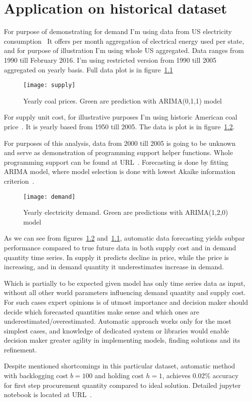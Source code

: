 
\chapter{Application on historical dataset}
\label{chap:Application on historical dataset}

For purpose of demonstrating for demand I'm using data from US electricity consumption~\autocite{us-elec} It offers per month aggregation of electrical energy used per state, and for purpose of illustration I'm using whole US aggregated. Data ranges from 1990 till February 2016. I'm using restricted version from 1990 till 2005 aggregated on yearly basis. Full data plot is in figure~\ref{fig:supply}

\begin{figure}[]
  \centering
  \texttt{[image: supply]}
  \caption{Yearly coal prices. Green are prediction with ARIMA(0,1,1) model}
  \label{fig:supply}
\end{figure}

For supply unit cost, for illustrative purposes I'm using historic American coal price~\autocite{us-coal}. It is yearly based from 1950 till 2005. The data is plot is in figure~\ref{fig:demand}.

For purposes of this analysis, data from 2000 till 2005 is going to be unknown and serve as demonstration of programming support helper functions. Whole programming support can be found at URL~\autocite{code}. Forecasting is done by fitting ARIMA model, where model selection is done with lowest Akaike information criterion~\autocite{Akaike1974}.

\begin{figure}[]
  \centering
  \texttt{[image: demand]}
  \caption{Yearly electricity demand. Green are predictions with ARIMA(1,2,0) model}
  \label{fig:demand}
\end{figure}

As we can see from figures~\ref{fig:demand} and~\ref{fig:supply}, automatic data forecasting yields subpar performance compared to true future data in both supply cost and in demand quantity time series. In supply it predicts decline in price, while the price is increasing, and in demand quantity it underestimates increase in demand.

Which is partially to be expected given model has only time series data as input, without all other world parameters influencing demand quantity and supply cost. For such cases expert opinions is of utmost importance and decision maker should decide which forecasted quantities make sense and which ones are underestimated/overestimated. Automatic approach works only for the most simplest cases, and knowledge of dedicated system or libraries would enable decision maker greater agility in implementing models, finding solutions and its refinement.

Despite mentioned shortcomings in this particular dataset, automatic method with backlogging cost $b=100$ and holding cost $h=1$, achieves 0.02\% accuracy for first step procurement quantity compared to ideal solution. Detailed jupyter notebook is located at URL~\autocite{jup}.
